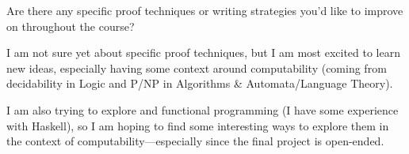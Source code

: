 \begin{problem}
  Are there any specific proof techniques or writing strategies
  you’d like to improve on throughout the course?
  \begin{answer}
    I am not sure yet about specific proof techniques,
    but I am most excited to learn new ideas,
    especially having some context around
    computability (coming from decidability in Logic
    and P/NP in Algorithms \& Automata/Language Theory).

    I am also trying to explore 
    and functional programming (I have some experience with Haskell),
    so I am hoping to find some interesting ways to explore them
    in the context of computability---especially since the
    final project is open-ended.
  \end{answer}
\end{problem}
